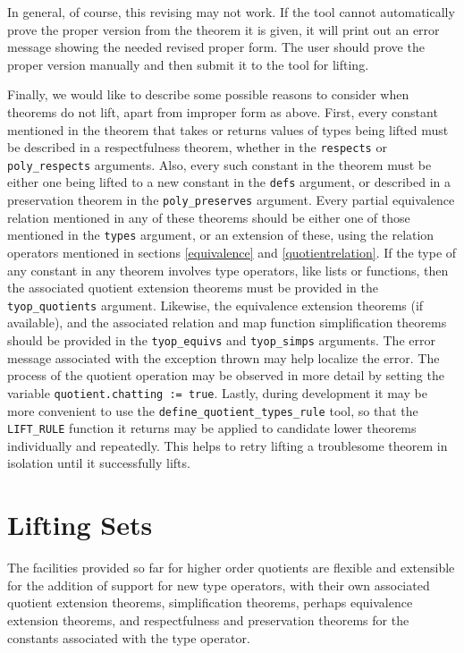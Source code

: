 \documentclass[envcountsame,runningheads]{llncs}
\begin{document}
In general, of course, this revising may not work.
If the tool cannot automatically prove the proper version from the theorem
it is given, it will print out an error message showing the needed revised
proper form.  The user should prove the proper version manually
and then submit
it
to the tool for lifting.

Finally, we would like to describe some possible reasons to consider
when theorems do not lift, apart from improper form as above.  First,
every constant mentioned in the theorem that takes or returns values
of types being lifted must be described in a respectfulness theorem,
whether in the {\tt respects} or {\tt poly\_respects} arguments.
Also, every such constant in the theorem
must be either one being lifted to a new constant in the {\tt defs} argument,
or described in a preservation theorem in the {\tt poly\_preserves} argument.
Every partial equivalence relation mentioned in any of these theorems
should be either one of those mentioned in the {\tt types} argument,
or an extension of these,
using the relation operators mentioned in sections
\ref{equivalence} and
\ref{quotientrelation}.
If the type of any constant in any theorem
involves type operators, like lists or functions, then the associated
quotient extension theorems must be provided in the
{\tt tyop\_quotients} argument.
Likewise, the equivalence extension theorems (if available),
and the associated relation and map function simplification theorems
should be provided
in the {\tt tyop\_equivs} and {\tt tyop\_simps} arguments.
The error message associated with the exception thrown may help localize
the error.
The process of the quotient operation may be observed in more detail
by setting the variable {\tt quotient.chatting := true}.
Lastly, during development it may be more convenient to use the
{\tt define\_quotient\_types\_rule} tool, so that the {\tt LIFT\_RULE}
function it returns may be applied to candidate lower theorems individually
and repeatedly.  This helps to retry lifting a troublesome theorem
in isolation until it successfully lifts.


%
\section{Lifting Sets}
%
\label{liftingsets}

The facilities provided so far for higher order quotients are flexible
and extensible for the addition of support for new type operators, with
their own associated quotient extension theorems, simplification theorems,
perhaps equivalence extension theorems, and respectfulness and 
preservation theorems for the
constants associated with the type operator.
\end{document}

